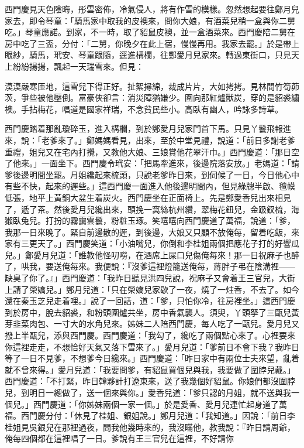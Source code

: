 西門慶見天色陰晦，彤雲密佈，冷氣侵人，將有作雪的模樣。忽然想起要往鄭月兒家去，即令琴童：「騎馬家中取我的皮襖來，問你大娘，有酒菜兒稍一盒與你二舅吃。」琴童應諾。到家，不一時，取了貂鼠皮襖，並一盒酒菜來。西門慶陪二舅在房中吃了三盃，分付：「二舅，你晚夕在此上宿，慢慢再用。我家去罷。」於是帶上眼紗，騎馬，玳安、琴童跟隨，逕進構欄，往鄭愛月兒家來。轉過東街口，只見天上紛紛揚揚，飄起一天瑞雪來。但見：

\begin{myquote} 
漠漠嚴寒匝地，這雪兒下得正好。扯絮撏綿，裁成片片，大如拷拷。見林間竹筍茆茨，爭些被他壓倒。富豪俠卻言：消災障猶嫌少。圍向那紅爐獸炭，穿的是貂裘繡襖。手拈梅花，唱道是國家祥瑞，不念貧民些小。高臥有幽人，吟詠多詩草。
\end{myquote} 

西門慶踏着那亂瓊碎玉，進入構欄，到於鄭愛月兒家門首下馬。只見丫鬟飛報進來，說：「老爹來了。」鄭媽媽看見，出來，至於中堂見禮，說道：「前日多謝老爹重禮，姐兒又在宅內打攪，又教他大娘、三娘賞他花翠汗巾。」西門慶道：「那日空了他來。」一面坐下。西門慶令玳安：「把馬牽進來，後邊院落安放。」老媽道：「請爹後邊明間坐罷。月姐纔起來梳頭，只說老爹昨日來，到伺候了一日，今日他心中有些不快，起來的遲些。」這西門慶一面進入他後邊明間內，但見綠牕半啟、氊幙低張，地平上黃銅大盆生着炭火。西門慶坐在正面椅上。先是鄭愛香兒出來相見了，遞了茶。然後愛月兒纔出來，頭挽一窩絲杭州纘，翠梅花鈕兒，金趿釵梳，海獺臥兔兒。打扮的霧靄雲鬟，粉粧玉琢。笑嘻嘻向西門慶道了萬福，說道：「爹，我那一日來晚了。緊自前邊散的遲，到後邊，大娘又只顧不放俺每，留着吃飯，來家有三更天了。」西門慶笑道：「小油嘴兒，你倒和李桂姐兩個把應花子打的好響瓜兒。」鄭愛月兒道：「誰教他怪叨嘮，在酒席上屎口兒傷俺每來！那一日祝麻子也醉了，哄我，要送俺每來。我便說：『沒爹這裡燈籠送俺每，蔣胖子弔在陰溝裡——缺臭了你了。』」西門慶道：「我昨日聽見洪四兒說，祝麻子又會着王三官兒，大街上請了榮嬌兒。」鄭月兒道：「只在榮嬌兒家歇了一夜，燒了一炷香，不去了。如今還在秦玉芝兒走着哩。」說了一回話，道：「爹，只怕你冷，往房裡坐。」這西門慶到於房中，脫去貂裘，和粉頭圍爐共坐，房中香氣襲人。須臾，丫頭拏了三甌兒黃芽韭菜肉包、一寸大的水角兒來。姊妹二人陪西門慶，每人吃了一甌兒。愛月兒又撥上半甌兒，添與西門慶。西門慶道：「我勾了，纔吃了兩個點心來了。心裡要來你這裡走走，不想恰好天氣又落下雪來了。」愛月兒道：「爹前日不會下我？我昨日等了一日不見爹，不想爹今日纔來。」西門慶道：「昨日家中有兩位士夫來望，亂着就不曾來得。」愛月兒道：「我要問爹，有貂鼠買個兒與我，我要做了圍脖兒戴。」西門慶道：「不打緊，昨日韓夥計打遼東來，送了我幾個好貂鼠。你娘們都沒圍脖兒，到明日一總做了，送一個來與你。」愛香兒道：「爹只認的月姐，就不送與我一個兒。」西門慶道：「你姊妹兩個一家一個。」{}於是愛香、愛月兒連忙起身道了萬福。西門慶分付：「休見了桂姐、銀姐說。」鄭月兒道：「我知道。」因說：「前日李桂姐見吳銀兒在那裡過夜，問我他幾時來的，我沒瞞他，教我說：『昨日請周爺，俺每四個都在這裡唱了一日。爹說有王三官兒在這裡，不好請你
